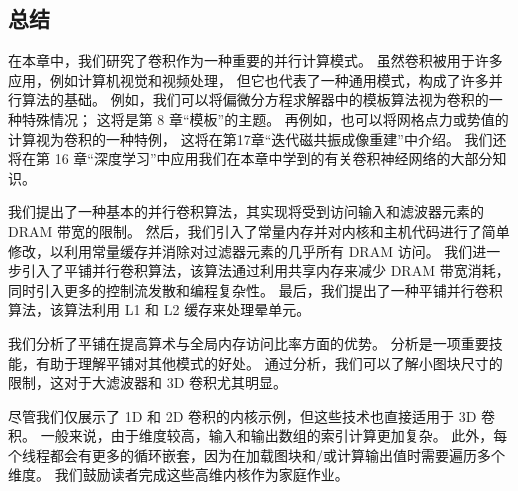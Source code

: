 \subsection{总结}
在本章中，我们研究了卷积作为一种重要的并行计算模式。 虽然卷积被用于许多应用，例如计算机视觉和视频处理，
但它也代表了一种通用模式，构成了许多并行算法的基础。 例如，我们可以将偏微分方程求解器中的模板算法视为卷积的一种特殊情况； 
这将是第 8 章“模板”的主题。 再例如，也可以将网格点力或势值的计算视为卷积的一种特例，
这将在第17章“迭代磁共振成像重建”中介绍。 
我们还将在第 16 章“深度学习”中应用我们在本章中学到的有关卷积神经网络的大部分知识。

我们提出了一种基本的并行卷积算法，其实现将受到访问输入和滤波器元素的 DRAM 带宽的限制。 
然后，我们引入了常量内存并对内核和主机代码进行了简单修改，以利用常量缓存并消除对过滤器元素的几乎所有 DRAM 访问。 
我们进一步引入了平铺并行卷积算法，该算法通过利用共享内存来减少 DRAM 带宽消耗，同时引入更多的控制流发散和编程复杂性。 
最后，我们提出了一种平铺并行卷积算法，该算法利用 L1 和 L2 缓存来处理晕单元。

我们分析了平铺在提高算术与全局内存访问比率方面的优势。 分析是一项重要技能，有助于理解平铺对其他模式的好处。 
通过分析，我们可以了解小图块尺寸的限制，这对于大滤波器和 3D 卷积尤其明显。

尽管我们仅展示了 1D 和 2D 卷积的内核示例，但这些技术也直接适用于 3D 卷积。 
一般来说，由于维度较高，输入和输出数组的索引计算更加复杂。 
此外，每个线程都会有更多的循环嵌套，因为在加载图块和/或计算输出值时需要遍历多个维度。 
我们鼓励读者完成这些高维内核作为家庭作业。